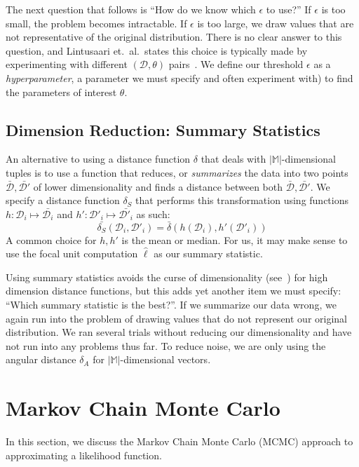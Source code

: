 The next question that follows is ``How do we know which $\epsilon$ to use?''
If $\epsilon$ is too small, the problem becomes intractable.
If $\epsilon$ is too large, we draw values that are not representative of the original distribution.
There is no clear answer to this question, and Lintusaari et.\ al.\ states this choice is typically made by
experimenting with different $(\mathcal{D}, \theta)$ pairs~\cite{lintusaariFundamentalsRecentDevelopments2017}.
We define our threshold $\epsilon$ as a \emph{hyperparameter}, a parameter we must specify and often experiment with)
to find the parameters of interest $\theta$.

\subsection{Dimension Reduction: Summary Statistics}\label{subsec:dimensionReductionSummaryStatistics}
An alternative to using a distance function $\delta$ that deals with $| \mathbb{M} |$-dimensional tuples is to use a
function that reduces, or \emph{summarizes} the data into two points $\bar{\mathcal{D}}, \bar{\mathcal{D}'}$ of lower
dimensionality and finds a distance between both $\bar{\mathcal{D}}, \bar{\mathcal{D}'}$.
We specify a distance function $\delta_S$ that performs this transformation using functions
$h : \mathcal{D}_i \mapsto \bar{\mathcal{D}_i}$ and $h' : \mathcal{D}'_i \mapsto \bar{\mathcal{D}'_i}$ as such:
\begin{equation}
    \bar{\delta_S}(\mathcal{D}_i, \mathcal{D}'_i)  = \bar{\delta}(h(\mathcal{D}_i), h'(\mathcal{D}'_i))
\end{equation}
A common choice for $h, h'$ is the mean or median.
For us, it may make sense to use the focal unit computation $\hat{\ell}$ as our summary statistic.

Using summary statistics avoids the curse of dimensionality (see~\cite{bellmanDynamicProgramming2013}) for high
dimension distance functions, but this adds yet another item we must specify: ``Which summary statistic is the best?''.
If we summarize our data wrong, we again run into the problem of drawing values that do not represent our original
distribution.
We ran several trials without reducing our dimensionality and have not run into any problems thus far.
To reduce noise, we are only using the angular distance $\delta_A$ for $| \mathbb{M} |$-dimensional vectors.

\section{Markov Chain Monte Carlo}\label{sec:markovChainMonteCarlo}
In this section, we discuss the Markov Chain Monte Carlo (MCMC) approach to approximating a likelihood function.


